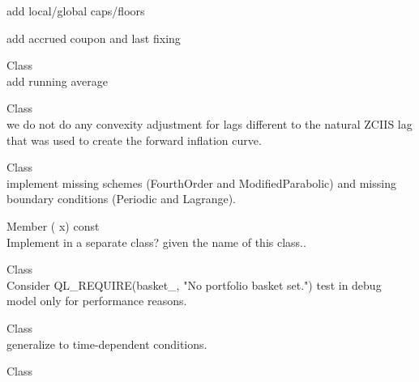 \begin{DoxyRefList}
\begin{DoxyItemize}
\item add local/global caps/floors
\item add accrued coupon and last fixing
\end{DoxyItemize}
\item[Class \doxylink{class_quant_lib_1_1_continuous_averaging_asian_option}{Quant\+Lib\+::Continuous\+Averaging\+Asian\+Option} ]\hfill \\
\label{todo__todo000036}%
%
add running average 
\item[Class \doxylink{class_quant_lib_1_1_c_p_i_coupon}{Quant\+Lib\+::CPICoupon} ]\hfill \\
\label{todo__todo000002}%
%
we do not do any convexity adjustment for lags different to the natural ZCIIS lag that was used to create the forward inflation curve.  
\item[Class \doxylink{class_quant_lib_1_1_cubic_interpolation}{Quant\+Lib\+::Cubic\+Interpolation} ]\hfill \\
\label{todo__todo000048}%
%
implement missing schemes (Fourth\+Order and Modified\+Parabolic) and missing boundary conditions (Periodic and Lagrange). 
\item[Member \doxylink{class_quant_lib_1_1_cumulative_behrens_fisher_a202231feee88fff46bdf62b08aadf024}{Quant\+Lib\+::Cumulative\+Behrens\+Fisher\+::density} (\doxylink{namespace_quant_lib_a372ac5c1a422a6b276fe0552d4d83f50}{Real} x) const]\hfill \\
\label{todo__todo000028}%
%
Implement in a separate class? given the name of this class..  
\item[Class \doxylink{class_quant_lib_1_1_default_latent_model}{Quant\+Lib\+::Default\+Latent\+Model\texorpdfstring{$<$}{<} copula\+Policy \texorpdfstring{$>$}{>}} ]\hfill \\
\label{todo__todo000012}%
%
Consider QL\+\_\+\+REQUIRE(basket\+\_\+, "{}\+No portfolio basket set."{}) test in debug model only for performance reasons.  
\item[Class \doxylink{class_quant_lib_1_1_dirichlet_b_c}{Quant\+Lib\+::Dirichlet\+BC} ]\hfill \\
\label{todo__todo000054}%
%
generalize to time-\/dependent conditions. 
\item[Class \doxylink{class_quant_lib_1_1_explicit_euler}{Quant\+Lib\+::Explicit\+Euler\texorpdfstring{$<$}{<} Operator \texorpdfstring{$>$}{>}} ]\hfill \\

\end{DoxyRefList}
